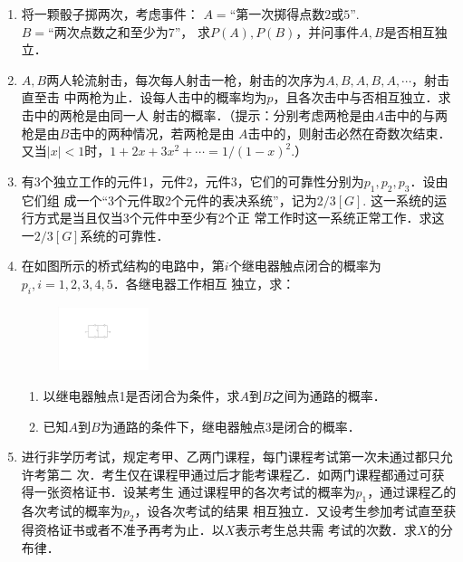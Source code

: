 \documentclass[10pt,a4paper]{article}
\begin{document}
\begin{enumerate}
    \item 将一颗骰子掷两次，考虑事件： $A=\mbox{“第一次掷得点数2或5”}$.$B=\mbox{“两次点数之和至少为7”}$，
    求$P(A),P(B)$，并问事件$A,B$是否相互独立．



    \item $A,B$两人轮流射击，每次每人射击一枪，射击的次序为$A,B,A,B,A,\cdots$，射击直至击
    中两枪为止．设每人击中的概率均为$p$，且各次击中与否相互独立．求击中的两枪是由同一人
    射击的概率．（提示：分别考虑两枪是由$A$击中的与两枪是由$B$击中的两种情况，若两枪是由
    $A$击中的，则射击必然在奇数次结束．又当$|x|<1$时，$1+2x+3x^2+\cdots=1/(1-x)^2$.）


    \item 有3个独立工作的元件1，元件2，元件3，它们的可靠性分别为$p_1,p_2,p_3$．设由它们组
    成一个“3个元件取2个元件的表决系统”，记为$2/3[G]$. 这一系统的运行方式是当且仅当3个元件中至少有2个正
    常工作时这一系统正常工作．求这一$2/3[G]$系统的可靠性．



    \item 在如图所示的桥式结构的电路中，第$i$个继电器触点闭合的概率为$p_i,i=1,2,3,4,5$．各继电器工作相互
    独立，求：
    \begin{figure}[H]
        \flushright 
        \includegraphics[width=0.25\textwidth]{8.pdf}
    \end{figure}
    \vspace{-0.5cm}
    \begin{enumerate}
        \item 以继电器触点1是否闭合为条件，求$A$到$B$之间为通路的概率．
        \item 已知$A$到$B$为通路的条件下，继电器触点3是闭合的概率．
    \end{enumerate}


    \item 进行非学历考试，规定考甲、乙两门课程，每门课程考试第一次未通过都只允许考第二
    次．考生仅在课程甲通过后才能考课程乙．如两门课程都通过可获得一张资格证书．设某考生
    通过课程甲的各次考试的概率为$p_1$，通过课程乙的各次考试的概率为$p_2$，设各次考试的结果
    相互独立．又设考生参加考试直至获得资格证书或者不准予再考为止．以$X$表示考生总共需
    考试的次数．求$X$的分布律．



\end{enumerate}
\end{document}

